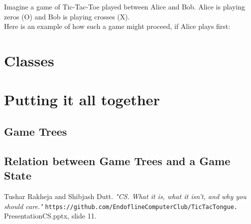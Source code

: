 \documentclass{article}
\begin{document}
\noindent Imagine a game of Tic-Tac-Toe played between Alice and Bob. Alice is playing zeros (O) and Bob is playing crosses (X). \\

\noindent Here is an example of how such a game might proceed, if Alice plays first:

\section{Classes}

\section{Putting it all together}

\subsection{Game Trees}

\subsection{Relation between Game Trees and a Game State}



\begin{thebibliography}{9}
Tushar Rakheja and Shibjash Dutt.
\textit{"CS. What it is, what it isn't, and why you should care."}
\texttt{https://github.com/EndoflineComputerClub/TicTacTongue.}
\\PresentationCS.pptx, slide 11. 
\end{thebibliography}
\end{document}
